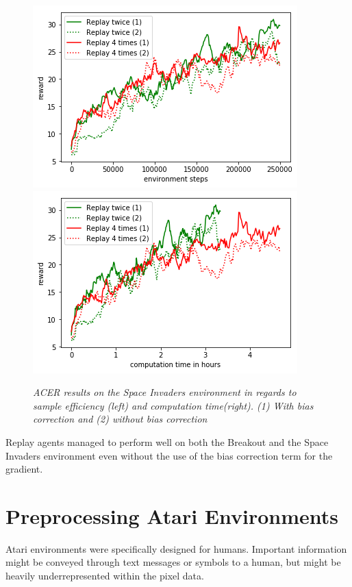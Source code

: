 \begin{figure}[h]
\includegraphics[scale=0.55]{bilder/spaceinvBConline.png}
\includegraphics[scale=0.55]{bilder/spaceinvBCtime.png}
\caption{\textit{ACER results on the Space Invaders environment in regards to sample efficiency (left) and computation time(right). (1) With bias correction and (2) without bias correction}}
\end{figure}



Replay agents managed to perform well on both the Breakout and the Space Invaders environment even without the use of the bias correction term for the gradient.

\pagebreak


\section{Preprocessing Atari Environments}

Atari environments were specifically designed for humans. Important information might be conveyed through text messages or symbols to a human, but might be heavily underrepresented within the pixel data.

